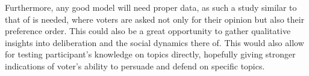 Furthermore, any good model will need proper data, as such a study similar to
that of \citet{fishkinCanDeliberationHave2024} is needed, where voters are
asked not only for their opinion but also their preference order. This could
also be a great opportunity to gather qualitative insights into deliberation
and the social dynamics there of. This would also allow for testing participant's
knowledge on topics directly, hopefully giving stronger indications of voter's ability
to persuade and defend on specific topics.

